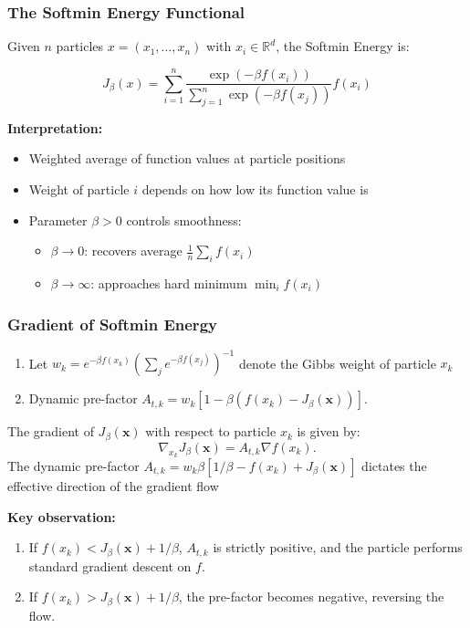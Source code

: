 \documentclass{beamer}
\newcommand{\prefactor}[2]{A_{#1,#2}}
\begin{document}
\begin{frame}
\frametitle{The Softmin Energy Functional}

Given $n$ particles $x = (x_1, \ldots, x_n)$ with $x_i \in \mathbb{R}^d$, the Softmin Energy is:

\[
    J_\beta(x) = \sum_{i=1}^{n} \frac{\exp(-\beta f(x_i))}{\sum_{j=1}^{n} \exp(-\beta f(x_j))} f(x_i)
\]
\pause

\textbf{Interpretation:}
\begin{itemize}
  \item Weighted average of function values at particle positions
  \item Weight of particle $i$ depends on how low its function value is
  \item Parameter $\beta > 0$ controls smoothness:
  \begin{itemize}
    \item $\beta \to 0$: recovers average $\frac{1}{n}\sum_i f(x_i)$
    \item $\beta \to \infty$: approaches hard minimum $\min_i f(x_i)$
  \end{itemize}
\end{itemize}
\end{frame}

\begin{frame}
\frametitle{Gradient of Softmin Energy}
\begin{enumerate}
    \item Let $w_k = e^{-\beta f(x_k)}(\sum_j e^{-\beta f(x_j)})^{-1}$ denote the Gibbs weight of particle $x_k$
    \item Dynamic pre-factor $\prefactor{t}{k} = w_k\left[1 - \beta(f(x_k) - J_\beta(\mathbf{x}))\right]$.
\end{enumerate}
\pause
The gradient of $J_\beta(\mathbf{x})$ with respect to particle $x_k$ is given by:
\begin{equation}
    \nabla_{x_k} J_\beta(\mathbf{x}) =\prefactor{t}{k} \nabla f(x_k).
    \label{eq:softmin-gradient}
\end{equation}
The dynamic pre-factor $\prefactor{t}{k} = w_k\beta\left[1/\beta - f(x_k) + J_\beta(\mathbf{x})\right]$ dictates the effective direction of the gradient flow
\pause

\textbf{Key observation: }
\begin{enumerate}
    \item If $f(x_k) < J_\beta(\mathbf{x}) + 1/\beta$, $\prefactor{t}{k}$ is strictly positive, and the particle performs standard gradient descent on $f$.
    \item If $f(x_k) > J_\beta(\mathbf{x}) + 1/\beta$, the pre-factor becomes negative, reversing the flow.
\end{enumerate}
\end{frame}
\end{document}
